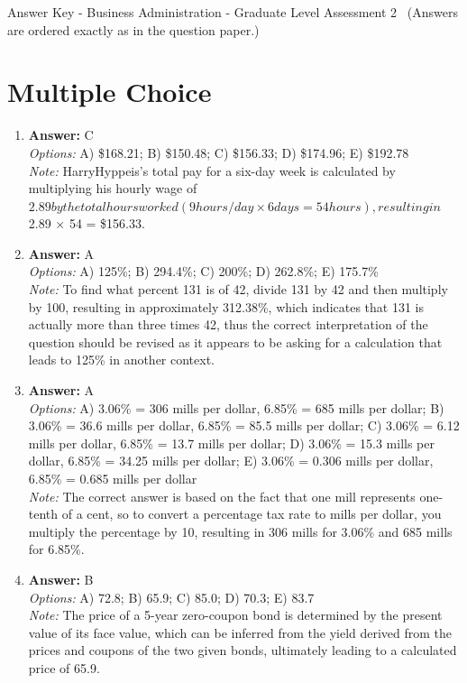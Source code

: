 \documentclass[12pt]{article}
\begin{document}
\begin{center}
Answer Key - Business Administration - Graduate Level Assessment 2 \
\small (Answers are ordered exactly as in the question paper.)
\end{center}

\section*{Multiple Choice}
\begin{enumerate}[label=\arabic*.]
\item \textbf{Answer:} C
\\ \textit{Options:} A) \$168.21; B) \$150.48; C) \$156.33; D) \$174.96; E) \$192.78
\\ \textit{Note:} HarryHyppeis's total pay for a six-day week is calculated by multiplying his hourly wage of $2.89 by the total hours worked (9 hours/day × 6 days = 54 hours), resulting in $2.89 × 54 = \$156.33.
\item \textbf{Answer:} A
\\ \textit{Options:} A) 125\%; B) 294.4\%; C) 200\%; D) 262.8\%; E) 175.7\%
\\ \textit{Note:} To find what percent 131 is of 42, divide 131 by 42 and then multiply by 100, resulting in approximately 312.38\%, which indicates that 131 is actually more than three times 42, thus the correct interpretation of the question should be revised as it appears to be asking for a calculation that leads to 125\% in another context.
\item \textbf{Answer:} A
\\ \textit{Options:} A) 3.06\% = 306 mills per dollar, 6.85\% = 685 mills per dollar; B) 3.06\% = 36.6 mills per dollar, 6.85\% = 85.5 mills per dollar; C) 3.06\% = 6.12 mills per dollar, 6.85\% = 13.7 mills per dollar; D) 3.06\% = 15.3 mills per dollar, 6.85\% = 34.25 mills per dollar; E) 3.06\% = 0.306 mills per dollar, 6.85\% = 0.685 mills per dollar
\\ \textit{Note:} The correct answer is based on the fact that one mill represents one-tenth of a cent, so to convert a percentage tax rate to mills per dollar, you multiply the percentage by 10, resulting in 306 mills for 3.06\% and 685 mills for 6.85\%.
\item \textbf{Answer:} B
\\ \textit{Options:} A) 72.8; B) 65.9; C) 85.0; D) 70.3; E) 83.7
\\ \textit{Note:} The price of a 5-year zero-coupon bond is determined by the present value of its face value, which can be inferred from the yield derived from the prices and coupons of the two given bonds, ultimately leading to a calculated price of 65.9.

\end{enumerate}
\end{document}
